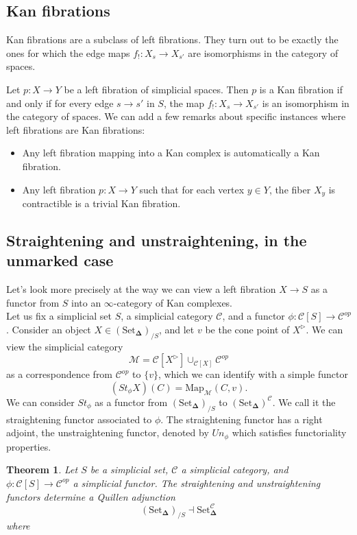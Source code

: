 \documentclass[a4paper, 12pt]{amsart}
\newcommand{\8}{\infty}
\newcommand{\SSet}{\text{Set}_\boldsymbol{\Delta}}
\newtheorem{theorem}{Theorem}
\begin{document}
\subsection{Kan fibrations}
Kan fibrations are a subclass of left fibrations. They turn out to be exactly the ones for which the edge maps $f_!:X_s\rightarrow X_{s'}$ are isomorphisms in the category of spaces.

Let $p:X\rightarrow Y$ be a left fibration of simplicial spaces. Then $p$ is a Kan fibration if and only if for every edge $s\rightarrow s'$ in $S$, the map $f_!:X_s\rightarrow X_{s'}$ is an isomorphism in the category of spaces.
We can add a few remarks about specific instances where left fibrations are Kan fibrations:
\begin{itemize}
  \item Any left fibration mapping into a Kan complex is automatically a Kan fibration.
  \item Any left fibration $p:X\rightarrow Y$ such that for each vertex $y\in Y$, the fiber $X_y$ is contractible is a trivial Kan fibration.
\end{itemize}


\subsection{Straightening and unstraightening, in the unmarked case}

Let's look more precisely at the way we can view a left fibration $X\rightarrow S$ as a functor from $S$ into an $\8$-category of Kan complexes. \\
Let us fix a simplicial set $S$, a simplicial category $\mathcal{C}$, and a functor $\phi:\mathscr{C}[S]\rightarrow \mathcal{C}^{op}$. Consider an object $X\in(\SSet)_{/S}$, and let $v$ be the cone point of $X^{\triangleright}$. We can view the simplicial category
\[\mathcal{M} = \mathscr{C}[X^{\triangleright}]\displaystyle \cup_{\mathscr{C}[X]}\mathcal{C}^{op}\] as a correspondence from $\mathcal{C}^{op}$ to $\{v\}$, which we can identify with a simple functor 
\[(St_\phi X)(C)=\text{Map}_\mathcal{M}(C,v).\]
We can consider $St_\phi$ as a functor from $(\SSet)_{/S}$ to $(\SSet)^\mathcal{C}$. We call it the straightening functor associated to $\phi$. 
The straightening functor has a right adjoint, the unstraightening functor, denoted by $Un_\phi$ which satisfies functoriality properties.

\begin{theorem}
  Let $S$ be a simplicial set, $\mathcal{C}$ a simplicial category, and $\phi:\mathscr{C}[S]\rightarrow\mathcal{C}^{op}$ a simplicial functor. The straightening and unstraightening functors determine a Quillen adjunction 
  \[(\SSet)_{/S}\dashv \SSet^\mathcal{C}\]
  where
\end{theorem}
\end{document}
